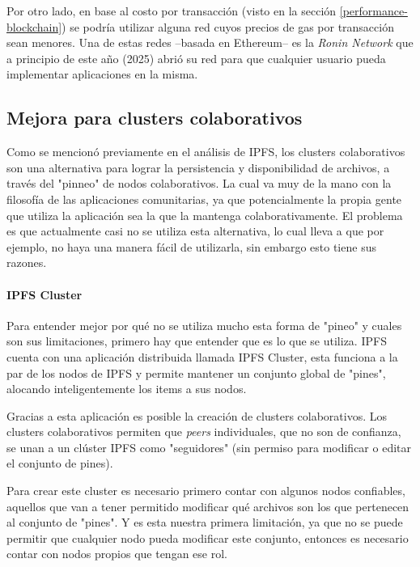 Por otro lado, en base al costo por transacción (visto en la sección \ref{performance-blockchain}) se podría utilizar alguna red cuyos precios de gas por transacción sean menores. Una de estas redes --basada en Ethereum-- es la \textit{Ronin Network} \cite{ronin-network} \cite{ronin-network-whitepaper} que a principio de este año (2025) abrió su red para que cualquier usuario pueda implementar aplicaciones en la misma.

\subsection{Mejora para clusters colaborativos}
Como se mencionó previamente en el análisis de IPFS, los clusters colaborativos son una alternativa para lograr la persistencia y disponibilidad de archivos, a través del "pinneo" de nodos colaborativos. La cual va muy de la mano con la filosofía de las aplicaciones comunitarias, ya que potencialmente la propia gente que utiliza la aplicación sea la que la mantenga colaborativamente. El problema es que actualmente casi no se utiliza esta alternativa, lo cual lleva a que por ejemplo, no haya una manera fácil de utilizarla, sin embargo esto tiene sus razones.

\paragraph{IPFS Cluster}

Para entender mejor por qué no se utiliza mucho esta forma de "pineo" y cuales son sus limitaciones, primero hay que entender que es lo que se utiliza. IPFS cuenta con una aplicación distribuida llamada IPFS Cluster, esta funciona a la par de los nodos de IPFS y permite mantener un conjunto global de "pines", alocando inteligentemente los items a sus nodos.

Gracias a esta aplicación es posible la creación de clusters colaborativos. Los clusters colaborativos permiten que \textit{peers} individuales, que no son de confianza, se unan a un clúster IPFS como "seguidores" (sin permiso para modificar o editar el conjunto de pines).

Para crear este cluster es necesario primero contar con algunos nodos confiables, aquellos que van a tener permitido modificar qué archivos son los que pertenecen al conjunto de "pines". Y es esta nuestra primera limitación, ya que no se puede permitir que cualquier nodo pueda modificar este conjunto, entonces es necesario contar con nodos propios que tengan ese rol.

